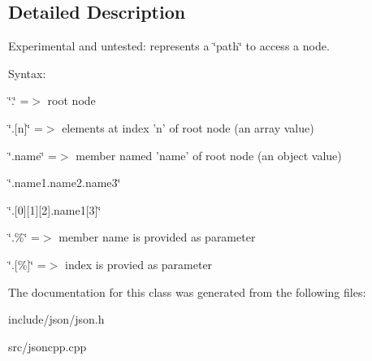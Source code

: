 \subsection{Detailed Description}
Experimental and untested\-: represents a \char`\"{}path\char`\"{} to access a node. 

Syntax\-:
\begin{DoxyItemize}
\item \char`\"{}.\char`\"{} =$>$ root node
\item \char`\"{}.\mbox{[}n\mbox{]}\char`\"{} =$>$ elements at index 'n' of root node (an array value)
\item \char`\"{}.\-name\char`\"{} =$>$ member named 'name' of root node (an object value)
\item \char`\"{}.\-name1.\-name2.\-name3\char`\"{}
\item \char`\"{}.\mbox{[}0\mbox{]}\mbox{[}1\mbox{]}\mbox{[}2\mbox{]}.\-name1\mbox{[}3\mbox{]}\char`\"{}
\item \char`\"{}.\%\char`\"{} =$>$ member name is provided as parameter
\item \char`\"{}.\mbox{[}\%\mbox{]}\char`\"{} =$>$ index is provied as parameter 
\end{DoxyItemize}

The documentation for this class was generated from the following files\-:\begin{DoxyCompactItemize}
\item 
include/json/json.\-h\item 
src/jsoncpp.\-cpp\end{DoxyCompactItemize}
